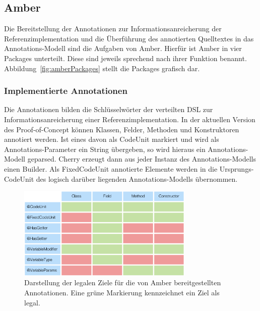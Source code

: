 \documentclass[12pt,oneside,a4paper,parskip]{scrbook}
\begin{document}
\subsection{Amber}

Die Bereitstellung der Annotationen zur Informationsanreicherung der Referenzimplementation und die Überführung des annotierten Quelltextes in das Annotations-Modell sind die Aufgaben von Amber. Hierfür ist Amber in vier Packages unterteilt. Diese sind jeweils sprechend nach ihrer Funktion benannt. Abbildung~\ref{fig:amberPackages} stellt die Packages grafisch dar.

\subsubsection{Implementierte Annotationen}

Die Annotationen bilden die Schlüsselwörter der verteilten DSL zur Informationsanreicherung einer Referenzimplementation. In der aktuellen Version des Proof-of-Concept können Klassen, Felder, Methoden und Konstruktoren annotiert werden. Ist eines davon als CodeUnit markiert und wird als Annotations-Parameter ein String übergeben, so wird hieraus ein Annotations-Modell geparsed. Cherry erzeugt dann aus jeder Instanz des Annotations-Modells einen Builder. Als FixedCodeUnit annotierte Elemente werden in die Ursprungs-CodeUnit des logisch darüber liegenden Annotations-Modells übernommen.

\begin{figure}[htbp]
	\centering
	\includegraphics[width=0.75\textwidth]{bilder/tblAnnoTrgt}
	\caption{Darstellung der legalen Ziele für die von Amber bereitgestellten Annotationen. Eine grüne Markierung kennzeichnet ein Ziel als legal.}
	\label{fig:tblAnnoTrgt}
\end{figure}
\end{document}
